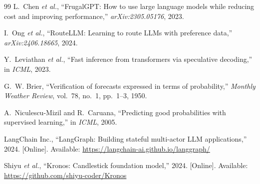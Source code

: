 \documentclass[conference]{IEEEtran}
\begin{document}
\begin{thebibliography}{99}
L.~Chen \emph{et al.},
``FrugalGPT: How to use large language models while reducing cost
and improving performance,''
\emph{arXiv:2305.05176}, 2023.

I.~Ong \emph{et al.},
``RouteLLM: Learning to route LLMs with preference data,''
\emph{arXiv:2406.18665}, 2024.

Y.~Leviathan \emph{et al.},
``Fast inference from transformers via speculative decoding,''
in \emph{ICML}, 2023.

G.~W. Brier,
``Verification of forecasts expressed in terms of probability,''
\emph{Monthly Weather Review}, vol.~78, no.~1, pp.~1--3, 1950.

A.~Niculescu-Mizil and R.~Caruana,
``Predicting good probabilities with supervised learning,''
in \emph{ICML}, 2005.

LangChain Inc.,
``LangGraph: Building stateful multi-actor LLM applications,''
2024. [Online]. Available:
\url{https://langchain-ai.github.io/langgraph/}

Shiyu \emph{et al.},
``Kronos: Candlestick foundation model,''
2024. [Online]. Available: \url{https://github.com/shiyu-coder/Kronos}

\end{thebibliography}
\end{document}
